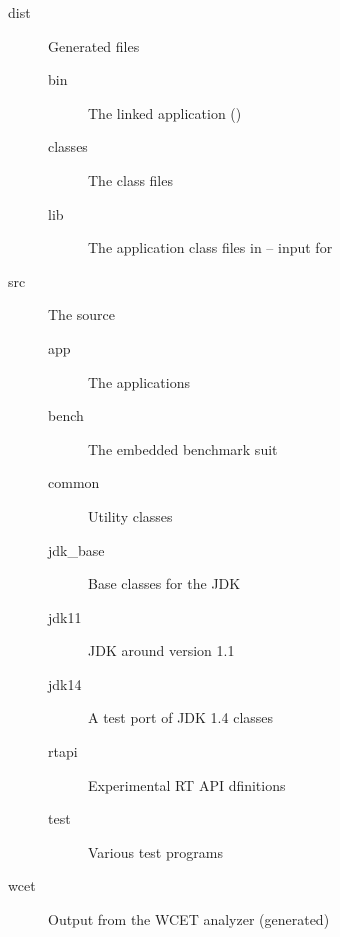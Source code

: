 \begin{description}
    \item[dist] Generated files
    \begin{description}
        \item[bin] The linked application ()
        \item[classes] The class files
        \item[lib] The application class files in 
        -- input for 
    \end{description}
    \item[src] The source
    \begin{description}
      \item[app] The applications
      \item[bench] The embedded benchmark suit
      \item[common] Utility classes
      \item[jdk\_base] Base classes for the JDK
      \item[jdk11] JDK around version 1.1
      \item[jdk14] A test port of JDK 1.4 classes
      \item[rtapi] Experimental RT API dfinitions
      \item[test] Various test programs
    \end{description}
    \item[wcet] Output from the WCET analyzer (generated)
\end{description}
